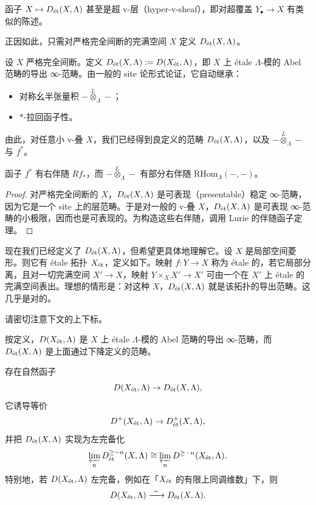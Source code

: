 \begin{remark}
函子 $X\mapsto D_{\et}(X,\Lambda)$ 甚至是超 v-层（hyper-v-sheaf），即对超覆盖 $Y_\bullet\to X$ 有类似的陈述。
\end{remark}

正因如此，只需对严格完全间断的完满空间 $X$ 定义 $D_{\et}(X,\Lambda)$。

\begin{definition}
设 $X$ 严格完全间断。定义 $D_{\et}(X,\Lambda):=D(X_{\et},\Lambda)$，即 $X$ 上 étale $\Lambda$-模的 Abel 范畴的导出 ∞-范畴。由一般的 site 论形式论证，它自动继承：
\begin{itemize}
\item 对称幺半张量积 $-\overset{L}{\otimes}_{\Lambda}-$；
\item $*$-拉回函子性。
\end{itemize}
\end{definition}
由此，对任意小 v-叠 $X$，我们已经得到良定义的范畴 $D_{\et}(X,\Lambda)$，以及 $-\overset{L}{\otimes}_{\Lambda}-$ 与 $f^*$。

\begin{proposition}
函子 $f^*$ 有右伴随 $Rf_*$，而 $-\overset{L}{\otimes}_{\Lambda}-$ 有部分右伴随 $\mathrm{RHom}_{\Lambda}(-,-)$。
\end{proposition}

\begin{proof}
对严格完全间断的 $X$，$D_{\et}(X,\Lambda)$ 是可表现（presentable）稳定 ∞-范畴，因为它是一个 site 上的层范畴。于是对一般的 v-叠 $X$，$D_{\et}(X,\Lambda)$ 是可表现 ∞-范畴的小极限，因而也是可表现的。为构造这些右伴随，调用 Lurie 的伴随函子定理。
\end{proof}

现在我们已经定义了 $D_{\et}(X,\Lambda)$，但希望更具体地理解它。设 $X$ 是局部空间菱形。则它有 étale 拓扑 $X_{\et}$，定义如下。映射 $f\colon Y\to X$ 称为 étale 的，若它局部分离，且对一切完满空间 $X'\to X$，映射 $Y\times_X X'\to X'$ 可由一个在 $X'$ 上 étale 的完满空间表出。理想的情形是：对这种 $X$，$D_{\et}(X,\Lambda)$ 就是该拓扑的导出范畴。这几乎是对的。


\begin{warning}
请密切注意下文的上下标。

按定义，$D(X_{\et},\Lambda)$ 是 $X$ 上 étale $\Lambda$-模的 Abel 范畴的导出 ∞-范畴，而 $D_{\et}(X,\Lambda)$ 是上面通过下降定义的范畴。
\end{warning}

\begin{theorem}
存在自然函子
\[
D(X_{\et},\Lambda)\to D_{\et}(X,\Lambda),
\]
它诱导等价
\[
D^+(X_{\et},\Lambda)\to D^+_{\et}(X,\Lambda),
\]
并把 $D_{\et}(X,\Lambda)$ 实现为左完备化
\[
\varprojlim_n D^{\ge -n}_{\et}(X,\Lambda)\cong\varprojlim_n D^{\ge -n}(X_{\et},\Lambda).
\]
特别地，若 $D(X_{\et},\Lambda)$ 左完备，例如在「$X_{\et}$ 的有限上同调维数」下，则
\[
D(X_{\et},\Lambda)\xrightarrow{\ \sim\ }D_{\et}(X,\Lambda).
\]
\end{theorem}

